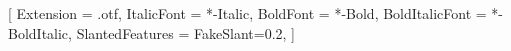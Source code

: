 \usepackage[margin=2.0cm,a5paper]{geometry}
\usepackage{fontspec}
\usepackage{graphicx}
\usepackage[greek,english,portuges]{babel}   %
\usepackage{indentfirst}

\setmainfont{QTCaslan}[
    Extension               = .otf,
    ItalicFont              = *-Italic,
    BoldFont                = *-Bold,
    BoldItalicFont          = *-BoldItalic,
    SlantedFeatures         = {FakeSlant=0.2},
]



